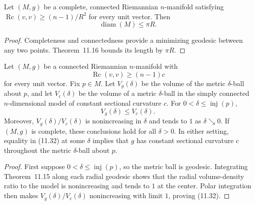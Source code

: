 \begin{corollary}
\label{cor:diameter-ricci-bounded}

Let $(M,g)$ be a complete, connected Riemannian $n$-manifold satisfying
$\operatorname{Rc}(v,v)\geq(n-1)/R^2$ for every unit vector. Then
\[
\operatorname{diam}(M)\leq\pi R.
\]

\begin{proof}
\sketch Completeness and connectedness provide a minimizing geodesic between
any two points. Theorem~11.16 bounds its length by $\pi R$.
\end{proof}
\end{corollary}

\begin{theorem}
\label{thm:bishop-gromov-volume-comparison}

Let $(M,g)$ be a connected Riemannian $n$-manifold with
\[
\operatorname{Rc}(v,v)\geq(n-1)c
\]
for every unit vector. Fix $p\in M$. Let $V_g(\delta)$ be the volume of the
metric $\delta$-ball about $p$, and let $V_c(\delta)$ be the volume of a
metric $\delta$-ball in the simply connected $n$-dimensional model of
constant sectional curvature $c$. For
$0<\delta\leq\operatorname{inj}(p)$,
\begin{equation}
V_g(\delta)\leq V_c(\delta).
\tag{11.32}
\end{equation}
Moreover, $V_g(\delta)/V_c(\delta)$ is nonincreasing in $\delta$ and tends to
$1$ as $\delta\searrow0$. If $(M,g)$ is complete, these conclusions hold for
all $\delta>0$. In either setting, equality in (11.32) at some $\delta$
implies that $g$ has constant sectional curvature $c$ throughout the metric
$\delta$-ball about $p$.

\begin{proof}
\sketch First suppose
$0<\delta\leq\operatorname{inj}(p)$, so the metric ball is geodesic.
Integrating Theorem~11.15 along each radial geodesic shows that the radial
volume-density ratio to the model is nonincreasing and tends to $1$ at the
center. Polar integration then makes
$V_g(\delta)/V_c(\delta)$ nonincreasing with limit $1$, proving (11.32).


\end{proof}
\end{theorem}
